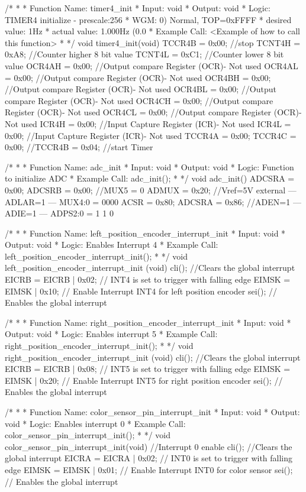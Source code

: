 /*
*
* Function Name: timer4_init
* Input: void
* Output: void
* Logic: TIMER4 initialize - prescale:256
*          WGM: 0) Normal, TOP=0xFFFF
*          desired value: 1Hz
*          actual value:  1.000Hz (0.0%
* Example Call: <Example of how to call this function>
*
*/
void timer4_init(void)
{
	TCCR4B = 0x00; //stop
	TCNT4H = 0xA8; //Counter higher 8 bit value
	TCNT4L = 0xC1; //Counter lower 8 bit value
	OCR4AH = 0x00; //Output compare Register (OCR)- Not used
	OCR4AL = 0x00; //Output compare Register (OCR)- Not used
	OCR4BH = 0x00; //Output compare Register (OCR)- Not used
	OCR4BL = 0x00; //Output compare Register (OCR)- Not used
	OCR4CH = 0x00; //Output compare Register (OCR)- Not used
	OCR4CL = 0x00; //Output compare Register (OCR)- Not used
	ICR4H  = 0x00; //Input Capture Register (ICR)- Not used
	ICR4L  = 0x00; //Input Capture Register (ICR)- Not used
	TCCR4A = 0x00;
	TCCR4C = 0x00;
	//TCCR4B = 0x04; //start Timer
}

/*
*
* Function Name: adc_init
* Input: void
* Output: void
* Logic: Function to initialize ADC
* Example Call: adc_init();
*
*/
void adc_init()
{
	ADCSRA = 0x00;
	ADCSRB = 0x00;		//MUX5 = 0
	ADMUX = 0x20;		//Vref=5V external --- ADLAR=1 --- MUX4:0 = 0000
	ACSR = 0x80;
	ADCSRA = 0x86;		//ADEN=1 --- ADIE=1 --- ADPS2:0 = 1 1 0
}

/*
*
* Function Name: left_position_encoder_interrupt_init
* Input: void
* Output: void
* Logic: Enables Interrupt 4
* Example Call: left_position_encoder_interrupt_init();
*
*/
void left_position_encoder_interrupt_init (void)
{
	cli(); //Clears the global interrupt
	EICRB = EICRB | 0x02; // INT4 is set to trigger with falling edge
	EIMSK = EIMSK | 0x10; // Enable Interrupt INT4 for left position encoder
	sei();   // Enables the global interrupt
}

/*
*
* Function Name: right_position_encoder_interrupt_init
* Input: void
* Output: void
* Logic: Enables interrupt 5
* Example Call: right_position_encoder_interrupt_init();
*
*/
void right_position_encoder_interrupt_init (void) 
{
	cli(); //Clears the global interrupt
	EICRB = EICRB | 0x08; // INT5 is set to trigger with falling edge
	EIMSK = EIMSK | 0x20; // Enable Interrupt INT5 for right position encoder
	sei();   // Enables the global interrupt
}

/*
*
* Function Name: color_sensor_pin_interrupt_init
* Input: void
* Output: void
* Logic: Enables interrupt 0
* Example Call: color_sensor_pin_interrupt_init();
*
*/
void color_sensor_pin_interrupt_init(void) //Interrupt 0 enable
{
	cli(); //Clears the global interrupt
	EICRA = EICRA | 0x02; // INT0 is set to trigger with falling edge
	EIMSK = EIMSK | 0x01; // Enable Interrupt INT0 for color sensor
	sei(); // Enables the global interrupt
}

